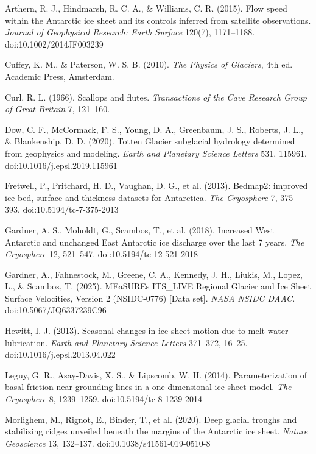 \documentclass[tc, manuscript]{copernicus}
\begin{document}
\begin{thebibliography}{}
Arthern, R. J., Hindmarsh, R. C. A., \& Williams, C. R. (2015). Flow speed within the Antarctic ice sheet and its controls inferred from satellite observations. \emph{Journal of Geophysical Research: Earth Surface} 120(7), 1171–1188. doi:10.1002/2014JF003239

Cuffey, K. M., \& Paterson, W. S. B. (2010). \emph{The Physics of Glaciers}, 4th ed. Academic Press, Amsterdam.

Curl, R. L. (1966). Scallops and flutes. \emph{Transactions of the Cave Research Group of Great Britain} 7, 121–160.

Dow, C. F., McCormack, F. S., Young, D. A., Greenbaum, J. S., Roberts, J. L., \& Blankenship, D. D. (2020). Totten Glacier subglacial hydrology determined from geophysics and modeling. \emph{Earth and Planetary Science Letters} 531, 115961. doi:10.1016/j.epsl.2019.115961


Fretwell, P., Pritchard, H. D., Vaughan, D. G., et al. (2013). Bedmap2: improved ice bed, surface and thickness datasets for Antarctica. \emph{The Cryosphere} 7, 375–393. doi:10.5194/tc-7-375-2013

Gardner, A. S., Moholdt, G., Scambos, T., et al. (2018). Increased West Antarctic and unchanged East Antarctic ice discharge over the last 7 years. \emph{The Cryosphere} 12, 521–547. doi:10.5194/tc-12-521-2018

Gardner, A., Fahnestock, M., Greene, C. A., Kennedy, J. H., Liukis, M., Lopez, L., \& Scambos, T. (2025). MEaSUREs ITS\_LIVE Regional Glacier and Ice Sheet Surface Velocities, Version 2 (NSIDC-0776) [Data set]. \emph{NASA NSIDC DAAC.} doi:10.5067/JQ6337239C96

Hewitt, I. J. (2013). Seasonal changes in ice sheet motion due to melt water lubrication. \emph{Earth and Planetary Science Letters} 371–372, 16–25. doi:10.1016/j.epsl.2013.04.022

Leguy, G. R., Asay-Davis, X. S., \& Lipscomb, W. H. (2014). Parameterization of basal friction near grounding lines in a one-dimensional ice sheet model. \emph{The Cryosphere} 8, 1239–1259. doi:10.5194/tc-8-1239-2014

Morlighem, M., Rignot, E., Binder, T., et al. (2020). Deep glacial troughs and stabilizing ridges unveiled beneath the margins of the Antarctic ice sheet. \emph{Nature Geoscience} 13, 132–137. doi:10.1038/s41561-019-0510-8


\end{thebibliography}
\end{document}
